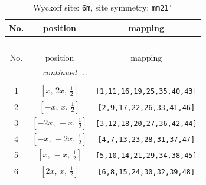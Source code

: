 \documentclass[fleqn,8pt]{jsarticle}
\begin{document}
\renewcommand{\arraystretch}{1.2}
\begin{longtable}{ccc}
\caption{Wyckoff site: {\tt 6m}, site symmetry: {\tt mm21'}}
 \\
 \hline \hline
No. & position & mapping \\ \hline \endfirsthead

\multicolumn{2}{l}{\tablename\ \thetable{}} \\
 \hline \hline
No. & position & mapping \\ \hline \endhead

 \hline \hline
\multicolumn{2}{r}{\footnotesize\it continued ...} \\ \endfoot

 \hline \hline
\multicolumn{2}{r}{} \\ \endlastfoot

1 & $\left[ x,\, 2 x,\, \frac{1}{2} \right]$ & {\tt [1,11,16,19,25,35,40,43]} \\ \hline
2 & $\left[ - x,\, x,\, \frac{1}{2} \right]$ & {\tt [2,9,17,22,26,33,41,46]} \\ \hline
3 & $\left[ - 2 x,\, - x,\, \frac{1}{2} \right]$ & {\tt [3,12,18,20,27,36,42,44]} \\ \hline
4 & $\left[ - x,\, - 2 x,\, \frac{1}{2} \right]$ & {\tt [4,7,13,23,28,31,37,47]} \\ \hline
5 & $\left[ x,\, - x,\, \frac{1}{2} \right]$ & {\tt [5,10,14,21,29,34,38,45]} \\ \hline
6 & $\left[ 2 x,\, x,\, \frac{1}{2} \right]$ & {\tt [6,8,15,24,30,32,39,48]} \\
\end{longtable}
\renewcommand{\arraystretch}{1.2}
\end{document}
